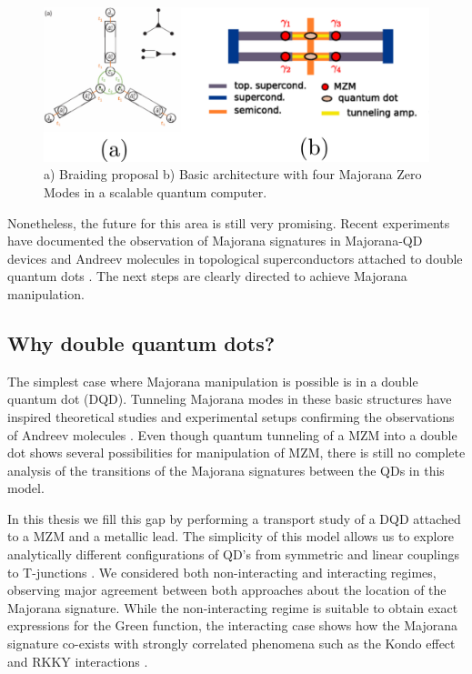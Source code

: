 \begin{figure}[H]
  \centering
  \includegraphics[scale=1]{IMAGES/Majorana/Prospective.png}
  \caption{\label{fig:braid} a) Braiding proposal b) Basic architecture with four Majorana Zero Modes in a scalable quantum computer.\protect{}}
\end{figure}

   Nonetheless, the future for this area is still very promising. Recent experiments have documented the observation of Majorana signatures in Majorana-QD devices \cite{deng_majorana_2016} and Andreev molecules in topological superconductors attached to double quantum dots \cite{su_andreev_2017}. The next steps are clearly directed to achieve Majorana manipulation. 

   \subsection{Why double quantum dots?}

    The simplest case where Majorana manipulation is possible is in a double quantum dot (DQD). Tunneling Majorana modes in these basic structures have inspired theoretical studies \cite{silva_andreev_2016,ivanov_coherent_2017} and experimental setups confirming the observations of Andreev molecules \cite{su_andreev_2017}. Even though quantum tunneling of a MZM into a double dot shows several possibilities for manipulation of MZM,  there is still no complete analysis of the transitions of the Majorana signatures between the QDs in this model.

   In this thesis we fill this gap by performing a transport study of a DQD attached to a MZM and a metallic lead. The simplicity of this model allows us to explore analytically different configurations of QD's from symmetric and linear couplings to T-junctions . We considered both non-interacting and interacting regimes, observing major agreement between both approaches about the location of the Majorana signature. While the non-interacting regime is suitable to obtain exact expressions for the Green function, the interacting case  shows how the Majorana signature co-exists with strongly correlated phenomena such as the Kondo effect  and RKKY interactions \cite{ruderman_indirect_1954,kasuya_theory_1956,yosida_magnetic_1957}. 




